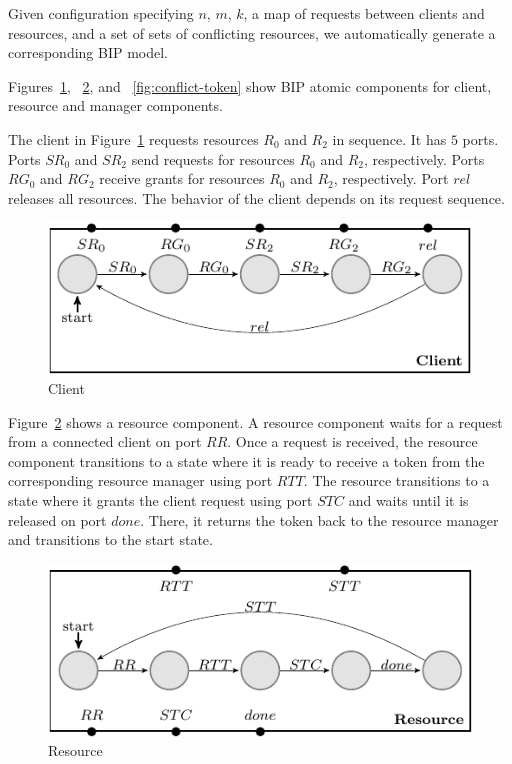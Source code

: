 Given configuration specifying $n$, $m$, $k$, a map of requests between clients and resources, and a set of sets of conflicting resources, 
we automatically generate a corresponding BIP model.

Figures~\ref{fig:client},
~\ref{fig:resource}, and
~\ref{fig:conflict-token}
show BIP atomic components for client, resource and manager components. 

The client in Figure~\ref{fig:client} requests resources $R_0$ and $R_2$ in sequence. It has $5$ ports. 
Ports $SR_0$ and $SR_2$ send requests for 
resources $R_0$ and $R_2$, respectively.
Ports $RG_0$ and $RG_2$ receive grants for 
resources $R_0$ and $R_2$, respectively.
Port $rel$ releases all resources. 
The behavior of the client depends on its request sequence. 

\begin{figure}[H]
\begin{center}
\includegraphics[scale=1.2]{compiledfigures/client-crop.pdf}
\caption{Client}
\label{fig:client}
\end{center}
\end{figure}

Figure~\ref{fig:resource} shows a resource component. 
A resource component waits for a request from a connected client on port $RR$. 
Once a request is received, the resource component transitions to a state where it is ready to 
receive a token from the corresponding resource manager using port $RTT$.
The resource transitions to a state where it grants the client request using port $STC$ and waits until it is released on port $done$. 
There, it returns the token back to the resource manager and transitions to the start state. 

\begin{figure}[H]
\begin{center}
\includegraphics[scale=1.2]{compiledfigures/resource-crop.pdf}
\caption{Resource}
\label{fig:resource}
\end{center}
\end{figure}

